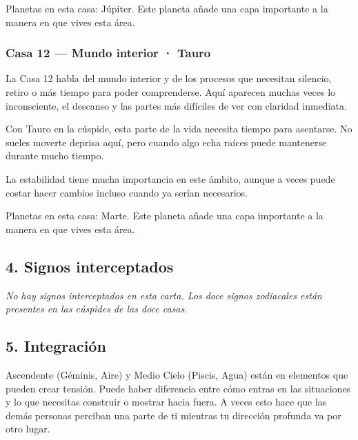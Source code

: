 \documentclass[11pt,a4paper]{article}
\begin{document}
Planetas en esta casa: Júpiter. Este planeta añade una capa importante a la manera en que vives esta área.

\subsubsection*{Casa 12 — Mundo interior · Tauro}
La Casa 12 habla del mundo interior y de los procesos que necesitan silencio, retiro o más tiempo para poder comprenderse. Aquí aparecen muchas veces lo inconsciente, el descanso y las partes más difíciles de ver con claridad inmediata.

Con Tauro en la cúspide, esta parte de la vida necesita tiempo para asentarse. No sueles moverte deprisa aquí, pero cuando algo echa raíces puede mantenerse durante mucho tiempo.

La estabilidad tiene mucha importancia en este ámbito, aunque a veces puede costar hacer cambios incluso cuando ya serían necesarios.

Planetas en esta casa: Marte. Este planeta añade una capa importante a la manera en que vives esta área.



\vspace{0.5cm}

\subsection{4. Signos interceptados}

\textit{No hay signos interceptados en esta carta. Los doce signos zodiacales están presentes en las cúspides de las doce casas.}


\vspace{0.5cm}

\subsection{5. Integración}

Ascendente (Géminis, Aire) y Medio Cielo (Piscis, Agua) están en elementos que pueden crear tensión. Puede haber diferencia entre cómo entras en las situaciones y lo que necesitas construir o mostrar hacia fuera. A veces esto hace que las demás personas perciban una parte de ti mientras tu dirección profunda va por otro lugar.
\end{document}
